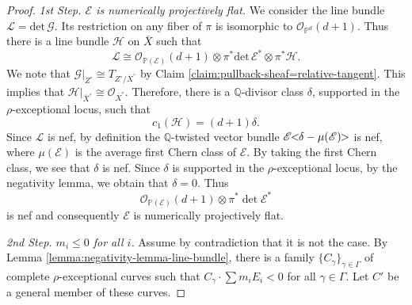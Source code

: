 \documentclass[english,reqno]{amsart}
\newcommand\bbP{{\mathbb P}}
\newcommand\sE{{\mathscr E}}
\newcommand\sG{{\mathscr G}}
\newcommand\sL{{\mathscr L}}
\newcommand\sO{{\mathscr O}}
\newcommand\sH{{\mathscr H}}
\theoremstyle{plain}
\theoremstyle{definition}
\numberwithin{equation}{section} %
\begin{document}
\begin{proof}
	
	\textit{1st Step. $\sE$ is numerically projectively flat.} We consider the line bundle $\sL = \mathrm{det}\, \sG$.
	Its restriction on any fiber of $\pi$ is isomorphic to $\sO_{\mathbb{P}^d}(d+1)$.
	Thus there is a line bundle $\sH$ on $\overline{X}$ such that
	$$
	\sL \cong \sO_{\mathbb{P}(\sE)}(d+1) \otimes \pi^*\mathrm{det}\, \sE^* \otimes \pi^*\sH.
	$$
	We note that $\sG|_{Z^\circ} \cong T_{Z^\circ/\overline{X}^\circ}$ by Claim \ref{claim:pullback-sheaf=relative-tangent}.
	This implies that $\sH|_{\overline{X}^\circ}\cong \sO_{\overline{X}^\circ}$.
	Therefore, there is a  $\mathbb{Q}$-divisor class $\delta$, supported in the $\rho$-exceptional locus, such that $$c_1(\sH) = (d+1) \delta.$$
	Since $\sL$ is nef, by definition the $\mathbb{Q}$-twisted vector bundle $\sE \hspace{-0.8ex}<\hspace{-0.8ex} \delta - \mu(\sE) \hspace{-0.8ex}> $ is  nef, where $\mu(\sE)$ is the average first Chern class of $\sE$.
	By taking the first Chern class, we see that $\delta$ is nef. Since $\delta$ is supported in the $\rho$-exceptional locus, by the negativity lemma, we obtain that $\delta=0$.
	Thus $$\sO_{\bbP(\sE)}(d+1)\otimes \pi^*\det\sE^*$$ is nef and consequently $\sE$ is numerically projectively flat.\\
	\smallskip	
	
	
	\textit{2nd Step.   $m_i\leqslant 0$ for all $i$.} Assume by contradiction that it is not the case.
	By Lemma \ref{lemma:negativity-lemma-line-bundle}, there is a family $\{C_\gamma\}_{\gamma\in \Gamma}$ of complete $\rho$-exceptional curves  such that $C_\gamma\cdot \sum m_iE_i<0$ for all $\gamma\in \Gamma$.
	Let $C'$ be a general member of these curves.
	

\end{proof}
\end{document}
